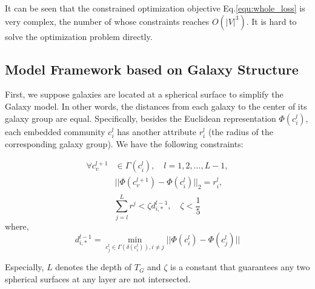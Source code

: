 \documentclass{article}
\theoremstyle{definition}
\begin{document}
		It can be seen that the constrained optimization objective Eq.\ref{equ:whole_loss} is very complex, the number of whose constraints reaches $O (|V|^3) $. It is hard to solve the optimization problem directly.

	 \subsection{Model Framework based on Galaxy Structure}
	 First, we suppose galaxies are located at a spherical surface to simplify the Galaxy model. In other words, the distances from each galaxy to the center of its galaxy group are equal. Specifically, besides the Euclidean representation $\Phi(c_i^l)$, each embedded community $c_i^l$ has another attribute $r_i^l$ (the radius of the corresponding galaxy group).
	 We have the following constraints:

	 \begin{equation}
	 \begin{split}
	 	\label{equ:sphere_constraints}
	 	\forall c_v^{l+1} & \in \Gamma(c_i^l), \quad l = 1, 2, ..., L - 1,\\
	 	& ||\Phi(c_v^{l+1})  - \Phi(c_i^l)||_2= r_i^l, \\	
	 \end{split}
	 \end{equation}
	 \begin{equation}
	 \label{equ:galaxy_constraints}
	 	\sum_{j=l}^L r^j < \zeta d^{l-1}_{i, *}, \quad \zeta < \frac{1}{5}	 	
	 \end{equation}
	 where,
	 \[
	 d_{i, *}^{l-1} = \min_{c_j^l \in \Gamma(\delta(c_i^l)), i \neq j} ||\Phi(c_i^l)-\Phi(c_j^l)||
	 \]

	 Especially, $L$ denotes the depth of $T_G$ and $\zeta$ is a constant that guarantees any two spherical surfaces at any layer are not intersected.
\end{document}
